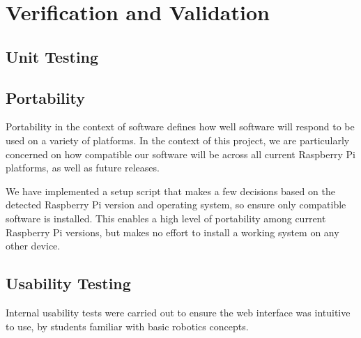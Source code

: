 \section{Verification and Validation}

\subsection{Unit Testing}


\subsection{Portability}
Portability in the context of software defines how well software will respond to be used on a variety of platforms. In the context of this project, we are particularly concerned on how compatible our software will be across all current Raspberry Pi platforms, as well as future releases.

We have implemented a setup script that makes a few decisions based on the detected Raspberry Pi version and operating system, so ensure only compatible software is installed. This enables a high level of portability among current Raspberry Pi versions, but makes no effort to install a working system on any other device.

\subsection{Usability Testing}
Internal usability tests were carried out to ensure the web interface was intuitive to use, by students familiar with basic robotics concepts. %
